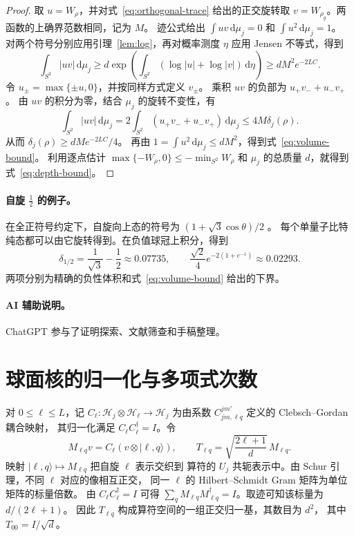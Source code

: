 \documentclass[UTF8,11pt,a4paper]{ctexart}
\theoremstyle{definition}
\newcommand{\dd}{\,\mathrm{d}}
\begin{document}
\begin{proof}
取 \(u=W_\rho\)，并对式~\eqref{eq:orthogonal-trace} 给出的正交旋转取
\(v=W_{\rho_g}\)。两函数的上确界范数相同，记为 \(M\)。
迹公式给出 \(\int uv\dd\mu_j=0\) 和 \(\int u^2\dd\mu_j=1\)。
对两个符号分别应用引理~\ref{lem:log}，再对概率测度 \(\eta\) 应用 Jensen 不等式，得到
\[
  \int_{S^2}|uv|\dd\mu_j
  \geq d\exp\left(\int_{S^2}(\log|u|+\log|v|)\dd\eta\right)
  \geq d M^2 e^{-2LC}.
\]
令 \(u_\pm=\max\{\pm u,0\}\)，并按同样方式定义 \(v_\pm\)。
乘积 \(uv\) 的负部为 \(u_+v_-+u_-v_+\)。
由 \(uv\) 的积分为零，结合 \(\mu_j\) 的旋转不变性，有
\[
  \int_{S^2}|uv|\dd\mu_j
  =2\int_{S^2}(u_+v_-+u_-v_+)\dd\mu_j
  \leq 4M\delta_j(\rho).
\]
从而 \(\delta_j(\rho)\geq d M e^{-2LC}/4\)。
再由 \(1=\int u^2\dd\mu_j\leq d M^2\)，得到式~\eqref{eq:volume-bound}。
利用逐点估计 \(\max\{-W_\rho,0\}\leq-\min_{S^2}W_\rho\) 和
\(\mu_j\) 的总质量 \(d\)，就得到式~\eqref{eq:depth-bound}。
\end{proof}

\paragraph{自旋 \(\tfrac12\) 的例子。}
在全正符号约定下，自旋向上态的符号为
\((1+\sqrt{3}\cos\theta)/2\) \cite[式 (16)]{davis2021}。
每个单量子比特纯态都可以由它旋转得到。在负值球冠上积分，得到
\[
  \delta_{1/2}=\frac{1}{\sqrt{3}}-\frac12\approx0.07735,
  \qquad
  \frac{\sqrt{2}}4 e^{-2(1+e^{-1})}\approx0.02293 .
\]
两项分别为精确的负性体积和式~\eqref{eq:volume-bound} 给出的下界。

\paragraph{AI 辅助说明。}
ChatGPT 参与了证明探索、文献筛查和手稿整理。

\appendix
\section{球面核的归一化与多项式次数}
\label{app:kernel}

对 \(0\leq\ell\leq L\)，记
\(C_\ell:\mathcal H_j\otimes\mathcal H_\ell\to\mathcal H_j\)
为由系数 \(C_{jm,\ell q}^{jm'}\) 定义的 Clebsch--Gordan 耦合映射，
其归一化满足 \(C_\ell C_\ell^\dagger=I\)。令
\[
  M_{\ell q}v=C_\ell(v\otimes|\ell,q\rangle),\qquad
  T_{\ell q}=\sqrt{\frac{2\ell+1}{d}}\,M_{\ell q}.
\]
映射 \(|\ell,q\rangle\mapsto M_{\ell q}\) 把自旋 \(\ell\) 表示交织到
算符的 \(U_j\) 共轭表示中。由 Schur 引理，不同 \(\ell\) 对应的像相互正交，
同一 \(\ell\) 的 Hilbert--Schmidt Gram 矩阵为单位矩阵的标量倍数。
由 \(C_\ell C_\ell^\dagger=I\) 可得
\(\sum_q M_{\ell q}M_{\ell q}^\dagger=I\)。取迹可知该标量为 \(d/(2\ell+1)\)。
因此 \(T_{\ell q}\) 构成算符空间的一组正交归一基，其数目为 \(d^2\)，
其中 \(T_{00}=I/\sqrt d\)。
\end{document}
